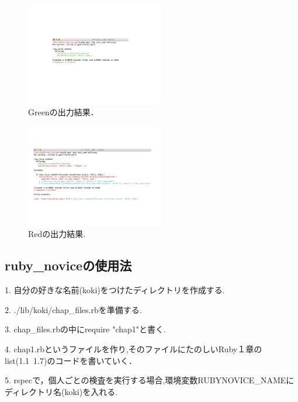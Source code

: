 \begin{figure}[htbp]\begin{center}
\includegraphics[width=6cm,bb=0 0 442 432]{../figs/./ruby_novice.004.jpg}
\caption{Greenの出力結果．}
\label{default}\end{center}\end{figure}
\begin{figure}[htbp]\begin{center}
\includegraphics[width=6cm,bb=0 0 442 432]{../figs/./ruby_novice.005.jpg}
\caption{Redの出力結果.}
\label{default}\end{center}\end{figure}
\subsection{ruby\_noviceの使用法}
1. 自分の好きな名前(koki)をつけたディレクトリを作成する.

2. ./lib/koki/chap\_files.rbを準備する.

3. chap\_files.rbの中にrequire "chap1"と書く.

4. chap1.rbというファイルを作り,そのファイルにたのしいRuby１章のlist(1.1~1.7)のコードを書いていく．

5. rspecで，個人ごとの検査を実行する場合,環境変数RUBYNOVICE\_NAMEにディレクトリ名(koki)を入れる.


